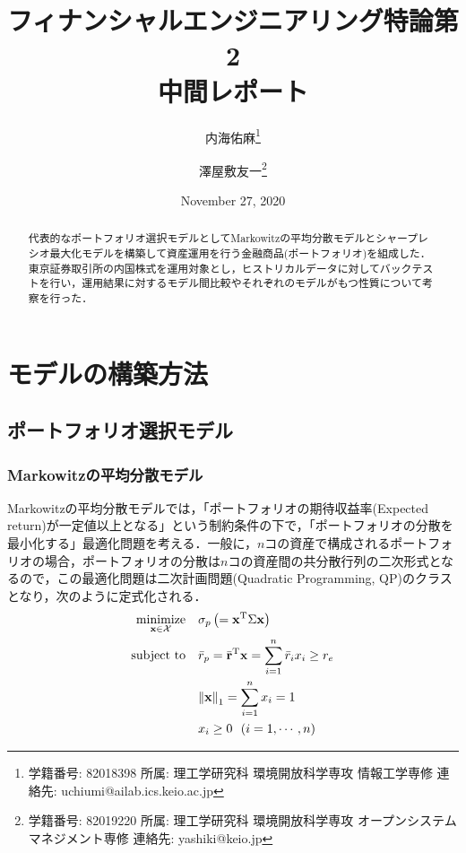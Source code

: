 \documentclass[dvipdfmx,autodetect-engine]{jsarticle}
\title{フィナンシャルエンジニアリング特論第2\\中間レポート}
\author{内海佑麻\footnote{学籍番号: 82018398 所属: 理工学研究科 環境開放科学専攻 情報工学専修 連絡先: uchiumi@ailab.ics.keio.ac.jp} 
    \and 澤屋敷友一\footnote{学籍番号: 82019220 所属: 理工学研究科 環境開放科学専攻 オープンシステムマネジメント専修 連絡先: yashiki@keio.jp }}
\date{November 27, 2020}
\begin{document}
\maketitle

\begin{abstract}
代表的なポートフォリオ選択モデルとしてMarkowitzの平均分散モデルとシャープレシオ最大化モデルを構築して資産運用を行う金融商品(ポートフォリオ)を組成した．東京証券取引所の内国株式を運用対象とし，ヒストリカルデータに対してバックテストを行い，運用結果に対するモデル間比較やそれぞれのモデルがもつ性質について考察を行った．
\end{abstract}

\tableofcontents

\newpage

\section{モデルの構築方法}

\subsection{ポートフォリオ選択モデル}

\subsubsection{Markowitzの平均分散モデル}

Markowitzの平均分散モデルでは，「ポートフォリオの期待収益率(Expected return)が一定値以上となる」という制約条件の下で，「ポートフォリオの分散を最小化する」最適化問題を考える．一般に，$n$コの資産で構成されるポートフォリオの場合，ポートフォリオの分散は$n$コの資産間の共分散行列の二次形式となるので，この最適化問題は二次計画問題(Quadratic Programming, QP)のクラスとなり，次のように定式化される．
\begin{align}
    \underset{\bf x \in \mathcal{X}}{\rm minimize} ~~~ 
    &\sigma_p \left( = {\bf x}^{\mathrm{T}} \Sigma {\bf x} \right) \\
    {\rm subject~to} ~~~ &\bar{r}_p = \bar{\bf r}^{\mathrm{T}} {\bf x} = \sum_{i=1}^{n} \bar{r}_i x_i \geq r_e \\
    &{\| {\bf x} \|}_{1} = \sum_{i=1}^{n} x_i = 1 \\
    &x_i \geq 0 ~~ (i = 1, \cdots, n)
\end{align}
\end{document}
